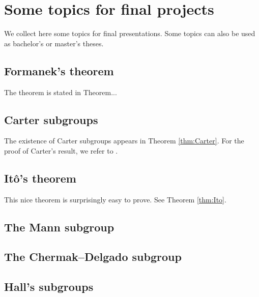 \section*{Some topics for final projects}

\fancyhf{}
\fancyfoot[R]{\thepage}
\fancyhead[L]{\course}
\setlength{\headheight}{14pt}

We collect here some topics for final presentations. Some topics
can also be used as bachelor's or master's theses.

\subsection*{Formanek's theorem}

The theorem is stated in Theorem...

\subsection*{Carter subgroups}

The existence of Carter subgroups appears in Theorem \ref{thm:Carter}. For the proof of Carter's result, we refer to \cite{MR0123603}.

\subsection*{It\^o's theorem}

This nice theorem is surprisingly easy to prove. See Theorem \ref{thm:Ito}. 

\subsection*{The Mann subgroup}

\subsection*{The Chermak--Delgado subgroup}

\subsection*{Hall's subgroups}

